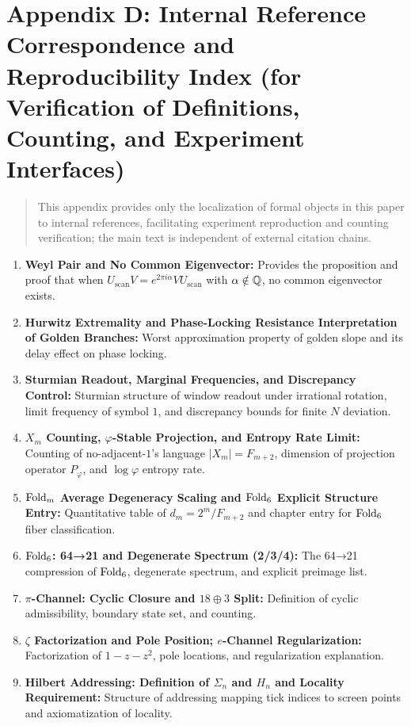 \section{Appendix D: Internal Reference Correspondence and Reproducibility Index (for Verification of Definitions, Counting, and Experiment Interfaces)}

\begin{quote}
This appendix provides only the localization of formal objects in this paper to internal references, facilitating experiment reproduction and counting verification; the main text is independent of external citation chains.
\end{quote}

\begin{enumerate}
  \item \textbf{Weyl Pair and No Common Eigenvector:} Provides the proposition and proof that when $U_{\mathrm{scan}}V=e^{2\pi i\alpha}VU_{\mathrm{scan}}$ with $\alpha\notin\mathbb{Q}$, no common eigenvector exists.
  \item \textbf{Hurwitz Extremality and Phase-Locking Resistance Interpretation of Golden Branches:} Worst approximation property of golden slope and its delay effect on phase locking.
  \item \textbf{Sturmian Readout, Marginal Frequencies, and Discrepancy Control:} Sturmian structure of window readout under irrational rotation, limit frequency of symbol $1$, and discrepancy bounds for finite $N$ deviation.
  \item \textbf{$X_m$ Counting, $\varphi$-Stable Projection, and Entropy Rate Limit:} Counting of no-adjacent-$1$'s language $|X_m|=F_{m+2}$, dimension of projection operator $P_\varphi$, and $\log\varphi$ entropy rate.
  \item \textbf{$\mathrm{Fold}_m$ Average Degeneracy Scaling and $\mathrm{Fold}_6$ Explicit Structure Entry:} Quantitative table of $d_m=2^m/F_{m+2}$ and chapter entry for $\mathrm{Fold}_6$ fiber classification.
  \item \textbf{$\mathrm{Fold}_6$: 64→21 and Degenerate Spectrum (2/3/4):} The 64→21 compression of $\mathrm{Fold}_6$, degenerate spectrum, and explicit preimage list.
  \item \textbf{$\pi$-Channel: Cyclic Closure and $18\oplus 3$ Split:} Definition of cyclic admissibility, boundary state set, and counting.
  \item \textbf{$\zeta$ Factorization and Pole Position; $e$-Channel Regularization:} Factorization of $1-z-z^2$, pole locations, and regularization explanation.
  \item \textbf{Hilbert Addressing: Definition of $\Sigma_n$ and $H_n$ and Locality Requirement:} Structure of addressing mapping tick indices to screen points and axiomatization of locality.

\end{enumerate}
